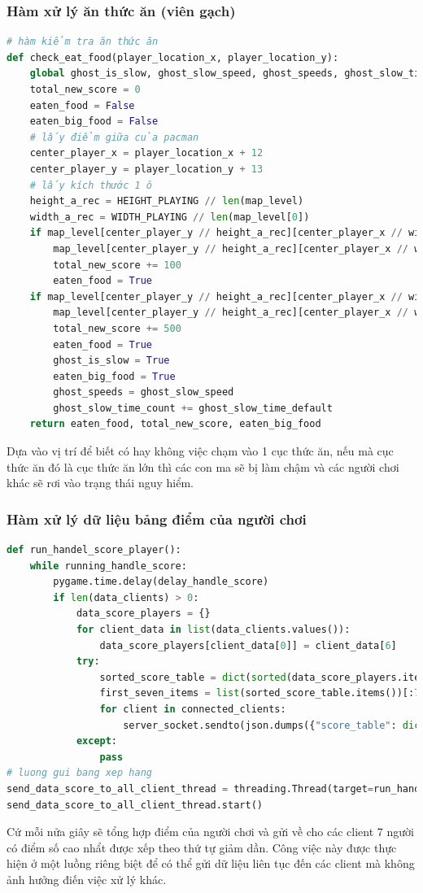 \documentclass[a4paper]{article}
\begin{document}
\subsubsection{Hàm xử lý ăn thức ăn (viên gạch)}
\begin{lstlisting}[language=Python]
# hàm kiểm tra ăn thức ăn
def check_eat_food(player_location_x, player_location_y):
    global ghost_is_slow, ghost_slow_speed, ghost_speeds, ghost_slow_time_count
    total_new_score = 0
    eaten_food = False
    eaten_big_food = False
    # lấy điểm giữa của pacman
    center_player_x = player_location_x + 12
    center_player_y = player_location_y + 13
    # lấy kích thước 1 ô
    height_a_rec = HEIGHT_PLAYING // len(map_level)
    width_a_rec = WIDTH_PLAYING // len(map_level[0])
    if map_level[center_player_y // height_a_rec][center_player_x // width_a_rec] == 1:
        map_level[center_player_y // height_a_rec][center_player_x // width_a_rec] = 0
        total_new_score += 100
        eaten_food = True
    if map_level[center_player_y // height_a_rec][center_player_x // width_a_rec] == 2:
        map_level[center_player_y // height_a_rec][center_player_x // width_a_rec] = 0
        total_new_score += 500
        eaten_food = True
        ghost_is_slow = True
        eaten_big_food = True
        ghost_speeds = ghost_slow_speed
        ghost_slow_time_count += ghost_slow_time_default
    return eaten_food, total_new_score, eaten_big_food
\end{lstlisting}
Dựa vào vị trí để biết có hay không việc chạm vào 1 cục thức ăn, nếu mà cục thức ăn đó là cục thức ăn lớn thì các con ma sẽ bị làm chậm và các người chơi khác sẽ rơi vào trạng thái nguy hiểm.


\subsubsection{Hàm xử lý dữ liệu bảng điểm của người chơi}
\begin{lstlisting}[language=Python]
def run_handel_score_player():
    while running_handle_score:
        pygame.time.delay(delay_handle_score)
        if len(data_clients) > 0:
            data_score_players = {}
            for client_data in list(data_clients.values()):
                data_score_players[client_data[0]] = client_data[6]
            try:
                sorted_score_table = dict(sorted(data_score_players.items(), key=lambda item: item[1], reverse=True))
                first_seven_items = list(sorted_score_table.items())[:7]
                for client in connected_clients:
                    server_socket.sendto(json.dumps({"score_table": dict(first_seven_items)}).encode(), client)
            except:
                pass
# luong gui bang xep hang
send_data_score_to_all_client_thread = threading.Thread(target=run_handel_score_player)
send_data_score_to_all_client_thread.start()
\end{lstlisting}
Cứ mỗi nửa giây sẽ tổng hợp điểm của người chơi và gửi về cho các client 7 người có điểm số cao nhẩt được xếp theo thứ tự giảm dần. Công việc này được thực hiện ở một luồng riêng biệt để có thể gửi dữ liệu liên tục đến các client mà không ảnh hưởng điến việc xử lý khác.
\end{document}
